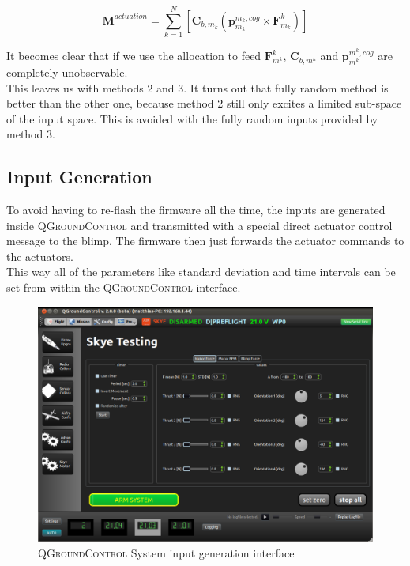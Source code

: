 \begin{equation}
\label{eq:m_actuation}
\mathbf{M}^{actuation} = \sum_{k=1}^N  \left[  \mathbf{C}_{b,m_k} \left( \mathbf{p}^{m_k,cog}_{m_k} \times \mathbf{F}^k_{m_k} \right)  \right]
\end{equation}

It becomes clear that if we use the allocation to feed $\mathbf{F}^k_{m^k}$, $\mathbf{C}_{b,m^k}$ and $\mathbf{p}^{m^k,cog}_{m^k}$ are completely unobservable.\\
This leaves us with methods 2 and 3.
It turns out that fully random method is better than the other one, because method 2 still only excites a limited sub-space of the input space. This is avoided with the fully random inputs provided by method 3.\\

\subsection{Input Generation}
\label{sub:input_generation}
To avoid having to re-flash the firmware all the time, the inputs are generated inside \textsc{QGroundControl} and transmitted with a special direct actuator control message to the blimp.
The firmware then just forwards the actuator commands to the actuators. \\
This way all of the parameters like standard deviation and time intervals can be set from within the \textsc{QGroundControl} interface.

\begin{figure}[hbtp]
\centering
\includegraphics[width=.9\linewidth]{images/qgc/QGroundControl_v_2.png}
\caption{\textsc{QGroundControl} System input generation interface}
\label{fig:qgc_input_gen}
\end{figure}

